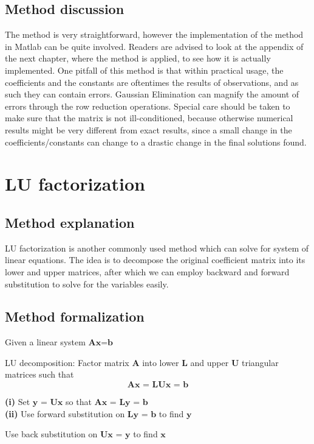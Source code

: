 \documentclass[openany]{book}
\begin{document}
    \subsection{Method discussion}
    The method is very straightforward, however the implementation of the method in Matlab can be quite involved. Readers are advised to look at the appendix of the next chapter, where the method is applied, to see how it is actually implemented. One pitfall of this method is that within practical usage, the coefficients and the constants are oftentimes the results of observations, and as such they can contain errors. Gaussian Elimination can magnify the amount of errors through the row reduction operations. Special care should be taken to make sure that the matrix is not ill-conditioned, because otherwise numerical results might be very different from exact results, since a small change in the coefficients/constants can change to a drastic change in the final solutions found.
    \section{LU factorization}
    \subsection{Method explanation}
    LU factorization is another commonly used method which can solve for system of linear equations. The idea is to decompose the original coefficient matrix into its lower and upper matrices, after which we can employ backward and forward substitution to solve for the variables easily.
    \subsection{Method formalization}
    	Given a linear system ${\textbf{Ax=b}}$
      \begin{steps}
			\item LU decomposition: Factor matrix ${\textbf{A}}$ into lower ${\textbf{L}}$ and upper ${\textbf{U}}$ triangular matrices such that 
            \[\textbf{Ax = LUx = b}\]
            \item \textbf{(i)} Set ${\textbf{y = Ux}}$ so that ${\textbf{Ax = Ly = b}}$\\
            \textbf{(ii)} Use forward substitution on ${\textbf{Ly = b}}$ to find ${\textbf{y}}$
            \item Use back substitution on ${\textbf{Ux = y}}$ to find ${\textbf{x}}$
      \end{steps}
\end{document}
